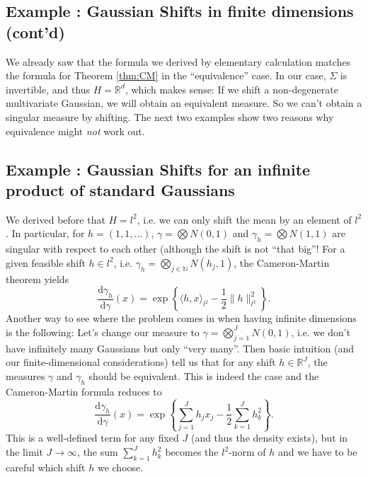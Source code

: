 \documentclass{scrartcl}
\theoremstyle{definition}
\theoremstyle{remark}
\newcommand{\de}{\mathrm d}
\newcommand{\N}{\mathbb N}
\newcommand{\R}{\mathbb R}
\newcommand*\circled[1]{\tikz[baseline=(char.base)]{
            \node[shape=circle,draw,inner sep=2pt] (char) {#1};}}
\DeclareRobustCommand{\myboxtwo}[2][blue!20]{%
\begin{tcolorbox}[   %
        breakable,
        left=0pt,
        right=0pt,
        top=0pt,
        bottom=0pt,
        colback=#1,
        colframe=#1,
        width=\dimexpr\textwidth\relax, 
        enlarge left by=0mm,
        boxsep=5pt,
        arc=10pt,outer arc=10pt,
        ]
        #2
\end{tcolorbox}
}
\begin{document}
\myboxtwo{\subsection*{Example \circled{1}: Gaussian Shifts in finite dimensions (cont'd)}
We already saw that the formula we derived by elementary calculation matches the formula for Theorem \ref{thm:CM} in the ``equivalence'' case. In our case, $\Sigma$ is invertible, and thus $H = \R^d$, which makes sense: If we shift a non-degenerate multivariate Gaussian, we will obtain an equivalent measure. So we can't obtain a singular measure by shifting. The next two examples show two reasons why equivalence might \emph{not} work out.
}
\myboxtwo{\subsection*{Example \circled{2}: Gaussian Shifts for an infinite product of standard Gaussians}
We derived before that $H = l^2$, i.e. we can only shift the mean by an element of $l^2$. In particular, for $h = (1,1,\ldots)$, $\gamma = \bigotimes N(0, 1)$ and $\gamma_h = \bigotimes N(1, 1)$ are singular with respect to each other (although the shift is not ``that big''! For a given feasible shift $h\in l^2$, i.e. $\gamma_h = \bigotimes_{j\in\N} N(h_j, 1)$, the Cameron-Martin theorem yields
\[ \frac{\de \gamma_h}{\de \gamma}(x) = \exp \left\{\langle h, x\rangle_{l^2} - \frac{1}{2}\|h\|_{l^2}^2\right\}.\]
Another way to see where the problem comes in when having infinite dimensions is the following: Let's change our measure to $\gamma = \bigotimes_{j=1}^J N(0,1)$, i.e. we don't have infinitely many Gaussians but only ``very many''. Then basic intuition (and our finite-dimensional considerations) tell us that for any shift $h\in\R^J$, the measures $\gamma$ and $\gamma_h$ should be equivalent. This is indeed the case and the Cameron-Martin formula reduces to
\[ \frac{\de \gamma_h}{\de \gamma}(x) = \exp \left\{\sum_{j=1}^Jh_jx_j - \frac{1}{2}\sum_{k=1}^J h_k^2\right\}.\]
This is a well-defined term for any fixed $J$ (and thus the density exists), but in the limit $J\to\infty$, the sum $\sum_{k=1}^J h_k^2$ becomes the $l^2$-norm of $h$ and we have to be careful which shift $h$ we choose.
}
\end{document}
